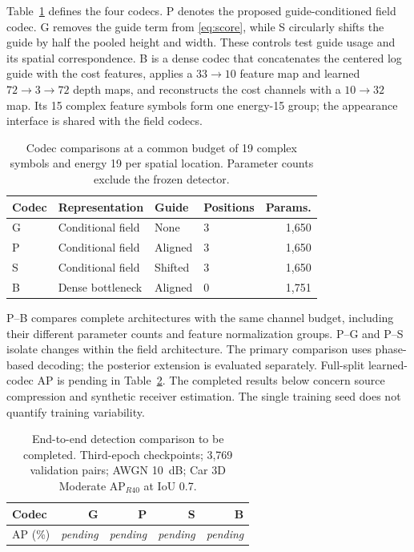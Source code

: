 \documentclass[conference]{IEEEtran}
\newcommand{\pending}{\textit{pending}}
\begin{document}
Table~\ref{tab:arms} defines the four codecs. P denotes the proposed
guide-conditioned field codec. G removes the guide term from
\eqref{eq:score}, while S circularly shifts the guide by half the pooled
height and width. These controls test guide usage and its spatial
correspondence. B is a dense codec that concatenates the centered log guide
with the cost features, applies a $33\!\to\!10$ feature map and learned
$72\!\to\!3\!\to\!72$ depth maps, and reconstructs the cost channels
with a $10\!\to\!32$ map. Its 15 complex feature symbols form one
energy-15 group; the appearance interface is shared with the field codecs.

\begin{table}[t]
\centering
\caption{Codec comparisons at a common budget of 19 complex symbols and
energy 19 per spatial location. Parameter counts exclude the frozen detector.}
\label{tab:arms}
\begin{tabular}{llllr}
\toprule
Codec & Representation & Guide & Positions & Params.\\
\midrule
G & Conditional field & None & 3 & 1,650\\
P & Conditional field & Aligned & 3 & 1,650\\
S & Conditional field & Shifted & 3 & 1,650\\
B & Dense bottleneck & Aligned & 0 & 1,751\\
\bottomrule
\end{tabular}
\end{table}

P--B compares complete architectures with the same channel budget, including
their different parameter counts and feature normalization groups. P--G and
P--S isolate changes within the field architecture. The primary comparison
uses phase-based decoding; the posterior extension is evaluated separately.
Full-split learned-codec AP is pending in Table~\ref{tab:pending}. The
completed results below concern source compression and synthetic receiver
estimation. The single training seed does not quantify training variability.

\begin{table}[t]
\centering
\caption{End-to-end detection comparison to be completed. Third-epoch
checkpoints; 3,769 validation pairs; AWGN 10~dB; Car 3D Moderate
AP$_{R40}$ at IoU 0.7.}
\label{tab:pending}
\begin{tabular}{lrrrr}
\toprule
Codec & G & P & S & B\\
\midrule
AP (\%) & \pending & \pending & \pending & \pending\\
\bottomrule
\end{tabular}
\end{table}
\end{document}
